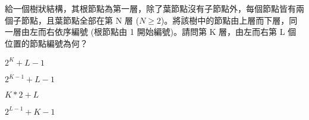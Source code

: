 \ifx\ntpcNinetyTwo\undefined[92學年基北區] \fi
\label{ntpc-92-p42} 給一個樹狀結構，其根節點為第一層，除了葉節點沒有子節點外，每個節點皆有兩個子節點，且葉節點全部在第 N 層 ($N\geq{2}$)。將該樹中的節點由上層而下層，同一層由左而右依序編號 (根節點由 1 開始編號)。請問第 K 層，由左而右第 L 個位置的節點編號為何？
  \begin{optionlist}
  \item $2^{K}+L-1$
  \item $2^{K-1}+L-1$\label{ntpc-92-a42}
  \item $K*2+L$
  \item $2^{L-1}+K-1$
  \end{optionlist}
